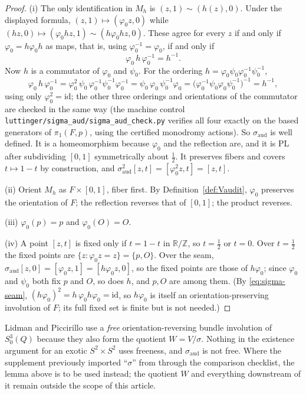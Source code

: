 \begin{proof}
(i) The only identification in $M_h$ is $(z,1)\sim(h(z),0)$.  Under the
displayed formula, $(z,1)\mapsto(\varphi_0 z,0)$ while
$(h z,0)\mapsto(\varphi_0 h z,1)\sim(h\varphi_0 h z,0)$.  These agree for
every $z$ if and only if $\varphi_0=h\varphi_0 h$ as maps, that is,
using $\varphi_0^{-1}=\varphi_0$, if and only if
\begin{equation}\label{eq:sigma-seam}
 \varphi_0\,h\,\varphi_0^{-1}=h^{-1}.
\end{equation}
Now $h$ is a commutator of $\varphi_0$ and $\psi_0$.  For the ordering
$h=\varphi_0\psi_0\varphi_0^{-1}\psi_0^{-1}$,
\[
 \varphi_0\,h\,\varphi_0^{-1}
 =\varphi_0^{2}\,\psi_0\,\varphi_0^{-1}\psi_0^{-1}\varphi_0^{-1}
 =\psi_0\,\varphi_0\,\psi_0^{-1}\varphi_0
 =\bigl(\varphi_0^{-1}\psi_0\varphi_0\psi_0^{-1}\bigr)^{-1}
 =h^{-1},
\]
using only $\varphi_0^{2}=\mathrm{id}$; the other three orderings and
orientations of the commutator are checked in the same way (the machine
control \texttt{luttinger/sigma\_aud/sigma\_aud\_check.py} verifies all
four exactly on the based generators of $\pi_1(F,p)$, using the
certified monodromy actions).  So $\sigma_{\mathrm{aud}}$ is well defined.
It is a homeomorphism because $\varphi_0$ and the reflection are, and it
is PL after subdividing $[0,1]$ symmetrically about $\tfrac12$.  It
preserves fibers and covers $t\mapsto1-t$ by construction, and
$\sigma_{\mathrm{aud}}^{2}[z,t]=[\varphi_0^{2}z,t]=[z,t]$.

(ii) Orient $M_h$ as $F\times[0,1]$, fiber first.  By
Definition~\ref{def:Vaudit}, $\varphi_0$ preserves the orientation of
$F$; the reflection reverses that of $[0,1]$; the product reverses.

(iii) $\varphi_0(p)=p$ and $\varphi_0(O)=O$.

(iv) A point $[z,t]$ is fixed only if $t=1-t$ in $\mathbb R/\mathbb Z$,
so $t=\tfrac12$ or $t=0$.  Over $t=\tfrac12$ the fixed points are
$\{z:\varphi_0 z=z\}=\{p,O\}$.  Over the seam,
$\sigma_{\mathrm{aud}}[z,0]=[\varphi_0 z,1]=[h\varphi_0 z,0]$, so the
fixed points are those of $h\varphi_0$; since $\varphi_0$ and $\psi_0$
both fix $p$ and $O$, so does $h$, and $p,O$ are among them.  (By
\eqref{eq:sigma-seam}, $(h\varphi_0)^2=h\,\varphi_0h\varphi_0=\mathrm{id}$,
so $h\varphi_0$ is itself an orientation-preserving involution of $F$;
its full fixed set is finite but is not needed.)
\end{proof}

\begin{remark}
Lidman and Piccirillo use a \emph{free} orientation-reversing bundle
involution of $S^3_0(Q)$ because they also form the quotient
$W=V/\sigma$.  Nothing in the existence argument for an exotic
$S^2\times S^2$ uses freeness, and $\sigma_{\mathrm{aud}}$ is not free.
Where the supplement previously imported ``$\sigma$'' from
\cite{LidmanPiccirillo} through the comparison checklist, the lemma
above is to be used instead; the quotient $W$ and everything downstream
of it remain outside the scope of this article.
\end{remark}

